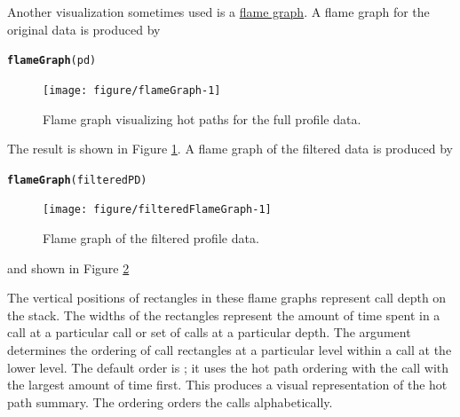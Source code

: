 \documentclass[nojss]{jss}\usepackage[]{graphicx}\usepackage[]{color}
\makeatletter
\newcommand{\hlstd}[1]{\textcolor[rgb]{0.345,0.345,0.345}{#1}}%
\newcommand{\hlkwd}[1]{\textcolor[rgb]{0.737,0.353,0.396}{\textbf{#1}}}%
\newenvironment{kframe}{%
 \def\at@end@of@kframe{}%
 \ifinner\ifhmode%
  \def\at@end@of@kframe{\end{minipage}}%
  \begin{minipage}{\columnwidth}%
 \fi\fi%
 \def\FrameCommand##1{\hskip\@totalleftmargin \hskip-\fboxsep
 \colorbox{shadecolor}{##1}\hskip-\fboxsep
     \hskip-\linewidth \hskip-\@totalleftmargin \hskip\columnwidth}%
 \MakeFramed {\advance\hsize-\width
   \@totalleftmargin\z@ \linewidth\hsize
   \@setminipage}}%
 {\par\unskip\endMakeFramed%
 \at@end@of@kframe}
\newenvironment{knitrout}{}{} %
\makeatother
\begin{document}
Another visualization sometimes used is a
\href{http://www.brendangregg.com/flamegraphs.html}{flame graph}. A flame graph for the original data is produced by
\begin{knitrout}\small
{}\color{fgcolor}\begin{kframe}
\begin{alltt}
\hlkwd{flameGraph}\hlstd{(pd)}
\end{alltt}
\end{kframe}\begin{figure}

{\centering \texttt{[image: figure/flameGraph-1]} 

}

\caption[Flame graph visualizing hot paths for the full profile data]{Flame graph visualizing hot paths for the full profile data.}\label{fig:flameGraph}
\end{figure}


\end{knitrout}
The result is shown in Figure \ref{fig:flameGraph}.  A flame graph of
the filtered data is produced by
\begin{knitrout}\small
{}\color{fgcolor}\begin{kframe}
\begin{alltt}
\hlkwd{flameGraph}\hlstd{(filteredPD)}
\end{alltt}
\end{kframe}\begin{figure}

{\centering \texttt{[image: figure/filteredFlameGraph-1]} 

}

\caption[Flame graph of the filtered profile data]{Flame graph of the filtered profile data.}\label{fig:filteredFlameGraph}
\end{figure}


\end{knitrout}
and shown in Figure \ref{fig:filteredFlameGraph}

The vertical positions of rectangles in these flame graphs represent
call depth on the stack. The widths of the rectangles represent the
amount of time spent in a call at a particular call or set of calls at
a particular depth. The  argument determines the ordering
of call rectangles at a particular level within a call at the lower
level. The default order is ; it uses the hot path
ordering with the call with the largest amount of time first.  This
produces a visual representation of the hot path summary.  The
 ordering orders the calls alphabetically.
\end{document}
